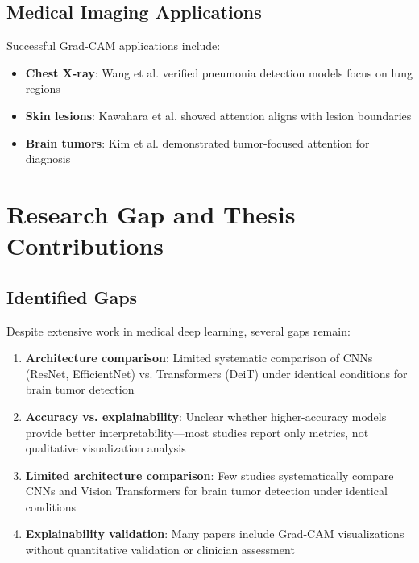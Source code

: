 \subsection{Medical Imaging Applications}

Successful Grad-CAM applications include:
\begin{itemize}
    \item \textbf{Chest X-ray}: Wang et al. \cite{wang2017chestxray} verified pneumonia detection models focus on lung regions
    \item \textbf{Skin lesions}: Kawahara et al. \cite{kawahara2018seven} showed attention aligns with lesion boundaries
    \item \textbf{Brain tumors}: Kim et al. \cite{kim2019brain} demonstrated tumor-focused attention for diagnosis
\end{itemize}

\section{Research Gap and Thesis Contributions}

\subsection{Identified Gaps}

Despite extensive work in medical deep learning, several gaps remain:

\begin{enumerate}
    \item \textbf{Architecture comparison}: Limited systematic comparison of CNNs (ResNet, EfficientNet) vs. Transformers (DeiT) under identical conditions for brain tumor detection
    
    \item \textbf{Accuracy vs. explainability}: Unclear whether higher-accuracy models provide better interpretability—most studies report only metrics, not qualitative visualization analysis
    
    \item \textbf{Limited architecture comparison}: Few studies systematically compare CNNs and Vision Transformers for brain tumor detection under identical conditions
    
    \item \textbf{Explainability validation}: Many papers include Grad-CAM visualizations without quantitative validation or clinician assessment
\end{enumerate}

